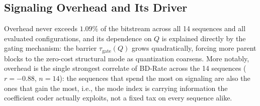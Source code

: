 \documentclass[conference]{IEEEtran}
\begin{document}
\begin{table}[t]
\centering
\caption{BD-Rate / BD-PSNR at best $B_c$, $K{=}24$ (mean$\pm$std over evaluation frames).
Boldface: best overall result.}
\label{tab:bdrate}
\end{table}

\subsection{Signaling Overhead and Its Driver}
Overhead never exceeds $1.09\%$ of the bitstream across all 14
sequences and all evaluated configurations, and its dependence on $Q$ is explained directly by
the gating mechanism: the barrier $\tau_{\text{gate}}(Q)$ grows quadratically, forcing more
parent blocks to the zero-cost structural mode as quantization coarsens. More notably, overhead
is the single strongest correlate of BD-Rate across the 14 sequences ($r=-0.88$, $n{=}14$):
the sequences that spend the most on signaling are also the ones that gain the most, i.e., the
mode index is carrying information the coefficient coder actually exploits, not a fixed tax on
every sequence alike.
\end{document}
